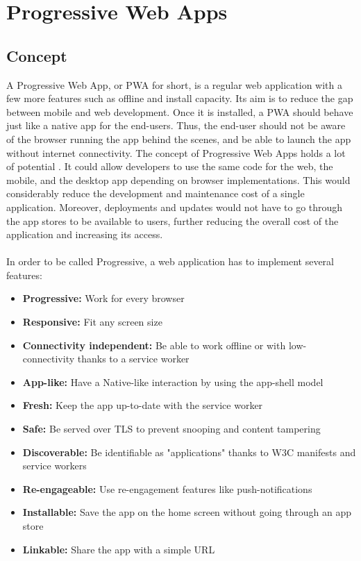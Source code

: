 \documentclass{kththesis}
\begin{document}
\section{Progressive Web Apps}

\subsection{Concept}

A Progressive Web App, or PWA for short, is a regular web application with a few more features such as offline and install capacity. Its aim is to reduce the gap between mobile and web development. Once it is installed, a PWA should behave just like a native app for the end-users. Thus, the end-user should not be aware of the browser running the app behind the scenes, and be able to launch the app without internet connectivity. \newline
The concept of Progressive Web Apps holds a lot of potential \cite{PWApossibleUnifer}. It could allow developers to use the same code for the web, the mobile, and the desktop app depending on browser implementations. This would considerably reduce the development and maintenance cost of a single application. Moreover, deployments and updates would not have to go through the app stores to be available to users, further reducing the overall cost of the application and increasing its access.
\paragraph{}
In order to be called Progressive, a web application has to implement several features\cite{PWA_def}:

\begin{itemize}
    \item \textbf{Progressive:} Work for every browser
    \item \textbf{Responsive:} Fit any screen size
    \item \textbf{Connectivity independent:} Be able to work offline or with low-connectivity thanks to a service worker
    \item \textbf{App-like:} Have a Native-like interaction by using the app-shell model
    \item \textbf{Fresh:} Keep the app up-to-date with the service worker
    \item \textbf{Safe:} Be served over TLS to prevent snooping and content tampering
    \item \textbf{Discoverable:} Be identifiable as "applications" thanks to W3C manifests and service workers
    \item \textbf{Re-engageable:} Use re-engagement features like push-notifications
    \item \textbf{Installable:} Save the app on the home screen without going through an app store
    \item \textbf{Linkable:} Share the app with a simple URL
\end{itemize}
\end{document}
